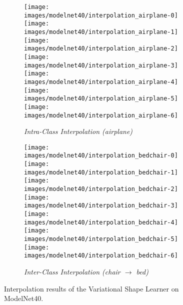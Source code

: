 \documentclass[10pt,twocolumn,letterpaper]{article}
\begin{document}
\begin{figure*}[ht!]
  \vspace{-0.5em}
  \centering
  \begin{subfigure}[b]{\textwidth}
    \centering
    \texttt{[image: images/modelnet40/interpolation\_airplane-0]}\qquad \texttt{[image: images/modelnet40/interpolation\_airplane-1]}\qquad \texttt{[image: images/modelnet40/interpolation\_airplane-2]}\qquad \texttt{[image: images/modelnet40/interpolation\_airplane-3]}\qquad \texttt{[image: images/modelnet40/interpolation\_airplane-4]}\qquad \texttt{[image: images/modelnet40/interpolation\_airplane-5]}\qquad \texttt{[image: images/modelnet40/interpolation\_airplane-6]}\qquad \caption*{\it Intra-Class Interpolation (airplane)}
  \end{subfigure}
  \quad
  \begin{subfigure}[b]{\textwidth}
    \centering
    \texttt{[image: images/modelnet40/interpolation\_bedchair-0]}\qquad \texttt{[image: images/modelnet40/interpolation\_bedchair-1]}\qquad \texttt{[image: images/modelnet40/interpolation\_bedchair-2]}\qquad \texttt{[image: images/modelnet40/interpolation\_bedchair-3]}\qquad \texttt{[image: images/modelnet40/interpolation\_bedchair-4]}\qquad \texttt{[image: images/modelnet40/interpolation\_bedchair-5]}\qquad \texttt{[image: images/modelnet40/interpolation\_bedchair-6]}\qquad \caption*{\it Inter-Class Interpolation (chair $\to$ bed)}
  \end{subfigure}
  \caption{Interpolation results of the Variational Shape Learner on ModelNet40.}
  \label{fig:shapeinterp}
\end{figure*}
\end{document}

